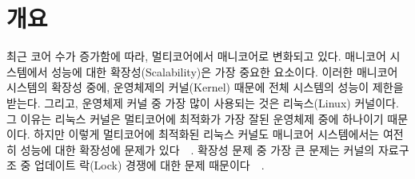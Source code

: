 \section{개요} \label{sec:intro}

최근 코어 수가 증가함에 따라, 멀티코어에서 매니코어로 변화되고 있다. 
매니코어 시스템에서 성능에 대한 확장성(Scalability)은 가장 중요한 요소이다. 
이러한 매니코어 시스템의 확장성 중에, 운영체제의 커널(Kernel) 때문에 전체 시스템의 성능이 제한을 받는다.
그리고, 운영체제 커널 중 가장 많이 사용되는 것은 리눅스(Linux) 커널이다. 
그 이유는 리눅스 커널은 멀티코어에 최적화가 가장 잘된 운영체제 중에 하나이기 때문이다.
하지만 이렇게 멀티코어에 최적화된 리눅스 커널도 매니코어 시스템에서는 여전히 
성능에 대한 확장성에 문제가
있다~\cite{SilasBoydWickizer2010LinuxScales48}~\cite{Changwoo2016UMSF}.
확장성 문제 중 가장 큰 문제는 커널의 자료구조 중 업데이트 락(Lock) 경쟁에 대한
문제 때문이다~\cite{mckenney2011parallel}~\cite{Matveev2015RLU}.


